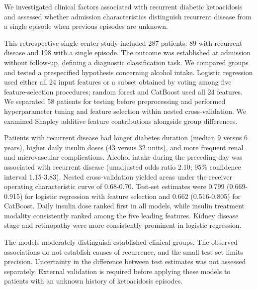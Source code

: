 \documentclass{crm-article}
\begin{document}
\begin{abstracteng}
We investigated clinical factors associated with recurrent diabetic ketoacidosis and assessed whether admission characteristics distinguish recurrent disease from a single episode when previous episodes are unknown.

This retrospective single-center study included 287 patients: 89 with recurrent disease and 198 with a single episode. The outcome was established at admission without follow-up, defining a diagnostic classification task. We compared groups and tested a prespecified hypothesis concerning alcohol intake. Logistic regression used either all 24 input features or a subset obtained by voting among five feature-selection procedures; random forest and CatBoost used all 24 features. We separated 58 patients for testing before preprocessing and performed hyperparameter tuning and feature selection within nested cross-validation. We examined Shapley additive feature contributions alongside group differences.

Patients with recurrent disease had longer diabetes duration (median 9 versus 6 years), higher daily insulin doses (43 versus 32 units), and more frequent renal and microvascular complications. Alcohol intake during the preceding day was associated with recurrent disease (unadjusted odds ratio 2.10; 95\% confidence interval 1.15-3.83). Nested cross-validation yielded areas under the receiver operating characteristic curve of 0.68-0.70. Test-set estimates were 0.799 (0.669-0.915) for logistic regression with feature selection and 0.662 (0.516-0.805) for CatBoost. Daily insulin dose ranked first in all models, while insulin treatment modality consistently ranked among the five leading features. Kidney disease stage and retinopathy were more consistently prominent in logistic regression.

The models moderately distinguish established clinical groups. The observed associations do not establish causes of recurrence, and the small test set limits precision. Uncertainty in the difference between test estimates was not assessed separately. External validation is required before applying these models to patients with an unknown history of ketoacidosis episodes.
\end{abstracteng}

\enlargethispage{3\baselineskip}
\maketitle
\end{document}
